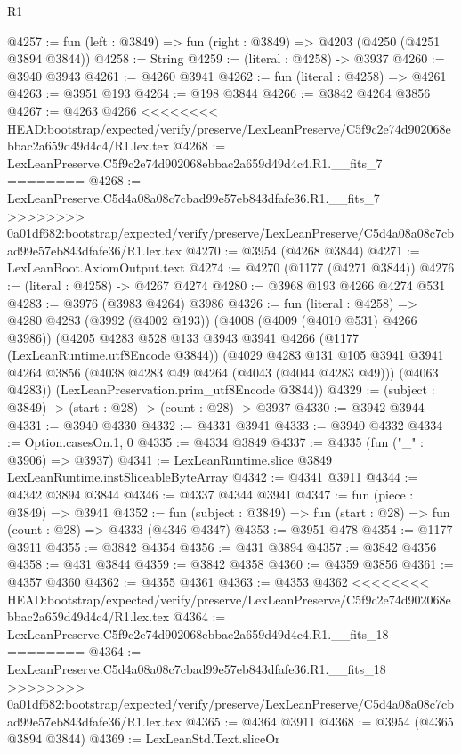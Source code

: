 \begin{lexlean}{R1}
\begin{coremodule}
{{{{{{{{{{{{{{{{{{{{{{{{{{{{{{{{{{{{{{{{{{{{{{{{{{{{{{{{{{{{{{{{{{{{{{{{{{{{{{{{{{{{{{{{{{{{{{{{{{{{{{{{{{{{{{{{{{{{{{{{{{{{{{{{{{{{{{{{{{{{{{{{{{{{{{{{{{{{{{{{{{{{{{{{{{{{{{{{{{{{{{{{{{@4257 := fun (left : @3849) => fun (right : @3849) => @4203 (@4250 (@4251 @3894 @3844))
@4258 := String
@4259 := (literal : @4258) -> @3937
@4260 := @3940 @3943
@4261 := @4260 @3941
@4262 := fun (literal : @4258) => @4261
@4263 := @3951 @193
@4264 := @198 @3844
@4266 := @3842 @4264 @3856
@4267 := @4263 @4266
<<<<<<<< HEAD:bootstrap/expected/verify/preserve/LexLeanPreserve/C5f9c2e74d902068ebbac2a659d49d4c4/R1.lex.tex
@4268 := LexLeanPreserve.C5f9c2e74d902068ebbac2a659d49d4c4.R1.__fits_7
========
@4268 := LexLeanPreserve.C5d4a08a08c7cbad99e57eb843dfafe36.R1.__fits_7
>>>>>>>> 0a01df682:bootstrap/expected/verify/preserve/LexLeanPreserve/C5d4a08a08c7cbad99e57eb843dfafe36/R1.lex.tex
@4270 := @3954 (@4268 @3844)
@4271 := LexLeanBoot.AxiomOutput.text
@4274 := @4270 (@1177 (@4271 @3844))
@4276 := (literal : @4258) -> @4267 @4274
@4280 := @3968 @193 @4266 @4274 @531
@4283 := @3976 (@3983 @4264) @3986
@4326 := fun (literal : @4258) =>
  @4280
    @4283
    (@3992 (@4002 @193))
    (@4008 (@4009 (@4010 @531) @4266 @3986))
    (@4205
      @4283
      @528
      @133
      @3943
      @3941
      @4266
      (@1177 (LexLeanRuntime.utf8Encode @3844))
      (@4029
        @4283
        @131
        @105
        @3941
        @3941
        @4264
        @3856
        (@4038 @4283 @49 @4264 (@4043 (@4044 @4283 @49)))
        (@4063 @4283))
      (LexLeanPreservation.prim_utf8Encode @3844))
@4329 := (subject : @3849) -> (start : @28) -> (count : @28) -> @3937
@4330 := @3942 @3944
@4331 := @3940 @4330
@4332 := @4331 @3941
@4333 := @3940 @4332
@4334 := Option.casesOn.{1, 0}
@4335 := @4334 @3849
@4337 := @4335 (fun ("_" : @3906) => @3937)
@4341 := LexLeanRuntime.slice @3849 LexLeanRuntime.instSliceableByteArray
@4342 := @4341 @3911
@4344 := @4342 @3894 @3844
@4346 := @4337 @4344 @3941
@4347 := fun (piece : @3849) => @3941
@4352 := fun (subject : @3849) => fun (start : @28) => fun (count : @28) => @4333 (@4346 @4347)
@4353 := @3951 @478
@4354 := @1177 @3911
@4355 := @3842 @4354
@4356 := @431 @3894
@4357 := @3842 @4356
@4358 := @431 @3844
@4359 := @3842 @4358
@4360 := @4359 @3856
@4361 := @4357 @4360
@4362 := @4355 @4361
@4363 := @4353 @4362
<<<<<<<< HEAD:bootstrap/expected/verify/preserve/LexLeanPreserve/C5f9c2e74d902068ebbac2a659d49d4c4/R1.lex.tex
@4364 := LexLeanPreserve.C5f9c2e74d902068ebbac2a659d49d4c4.R1.__fits_18
========
@4364 := LexLeanPreserve.C5d4a08a08c7cbad99e57eb843dfafe36.R1.__fits_18
>>>>>>>> 0a01df682:bootstrap/expected/verify/preserve/LexLeanPreserve/C5d4a08a08c7cbad99e57eb843dfafe36/R1.lex.tex
@4365 := @4364 @3911
@4368 := @3954 (@4365 @3894 @3844)
@4369 := LexLeanStd.Text.sliceOr
}}}}}}}}}}}}}}}}}}}}}}}}}}}}}}}}}}}}}}}}}}}}}}}}}}}}}}}}}}}}}}}}}}}}}}}}}}}}}}}}}}}}}}}}}}}}}}}}}}}}}}}}}}}}}}}}}}}}}}}}}}}}}}}}}}}}}}}}}}}}}}}}}}}}}}}}}}}}}}}}}}}}}}}}}}}}}}}}}}}}}}}}}}
\end{coremodule}
\end{lexlean}
